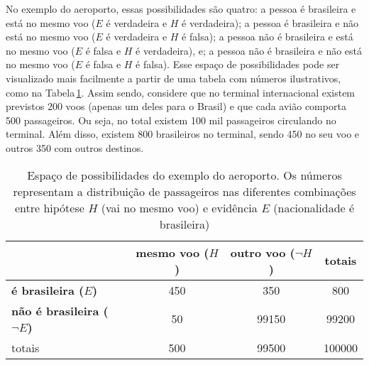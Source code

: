 \documentclass[./main.tex]{subfiles}
\begin{document}
\par No exemplo do aeroporto, essas possibilidades são quatro: a pessoa é brasileira e está no mesmo voo ($E$ é verdadeira e $H$ é verdadeira); a pessoa é brasileira e não está no mesmo voo ($E$ é verdadeira e $H$ é falsa); a pessoa não é brasileira e está no mesmo voo ($E$ é falsa e $H$ é verdadeira), e; a pessoa não é brasileira e não está no mesmo voo ($E$ é falsa e $H$ é falsa). Esse espaço de possibilidades pode ser visualizado mais facilmente a partir de uma tabela com números ilustrativos, como na Tabela\,\ref{tbl:bayes-aeroporto}. Assim sendo, considere que no terminal internacional existem previstos 200 voos (apenas um deles para o Brasil) e que cada avião comporta 500 passageiros. Ou seja, no total existem 100 mil passageiros circulando no terminal. Além disso, existem 800 brasileiros no terminal, sendo 450 no seu voo e outros 350 com outros destinos.
\begin{table}[ht]
    \centering	
    \small
    \sffamily
    \begin{tabular}{ l  c  c  c} %
       & \textbf{mesmo voo ($H$)} & \textbf{outro voo ($\neg H$)} & totais\\  
        \hline
        \textbf{é brasileira ($E$)} & 450 & 350 & 800\\
        \textbf{não é brasileira ($\neg E$)} & 50 & 99150 & 99200\\
        \hline
        totais & 500 & 99500 & 100000\\
    \end{tabular}
    \caption[Espaço de possibilidades do exemplo do aeroporto]{Espaço de possibilidades do exemplo do aeroporto. Os números representam a distribuição de passageiros nas diferentes combinações entre hipótese $H$ (vai no mesmo voo) e evidência $E$ (nacionalidade é brasileira)}
    \label{tbl:bayes-aeroporto}
\end{table} 
\end{document}
